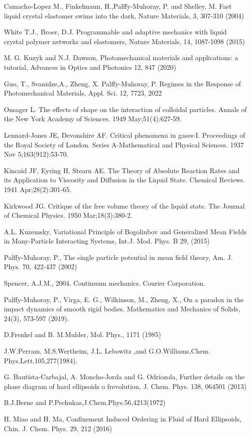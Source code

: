\documentclass{article}
\begin{document}
\begin{thebibliography}{99}
	

 Camacho-Lopez M., Finkelmann, H.,Palffy-Muhoray, P. and
Shelley, M. Fast liquid crystal elastomer swims into the dark, Nature
Materials, 3, 307-310 (2004)

 White T.J., Broer, D.J. Programmable and adaptive mechanics
with liquid crystal polymer networks and elastomers, Nature Materials, 14,
1087-1098 (2015)

 M. G. Kuzyk and N.J. Dawson, Photomechanical materials and
applications: a tutorial, Advances in Optics and Photonics 12, 847 (2020) 

 Guo, T., Svanidze,A., Zheng, X. Palffy-Muhoray, P. Regimes in
the Response of Photomechanical Materials, Appl. Sci. 12, 7723, 2022

 Onsager L. The effects of shape on the interaction of
colloidal particles. Annals of the New York Academy of Sciences. 1949
May;51(4):627-59.

 Lennard-Jones JE, Devonshire AF. Critical phenomena
in gases-I. Proceedings of the Royal Society of London. Series
A-Mathematical and Physical Sciences. 1937 Nov 5;163(912):53-70.

 Kincaid JF, Eyring H, Stearn AE. The Theory of Absolute
Reaction Rates and its Application to Viscosity and Diffusion in the Liquid
State. Chemical Reviews. 1941 Apr;28(2):301-65.

 Kirkwood JG. Critique of the free volume theory of
the liquid state. The Journal of Chemical Physics. 1950 Mar;18(3):380-2.

 A.L. Kuzemsky, Variational Principle of Bogoliubov and
Generalized Mean Fields in Many-Particle Interacting Systems, Int.J. Mod.
Phys. B 29, (2015)

 Palffy-Muhoray, P., The single particle potential in mean
field theory, Am. J. Phys. 70, 422-437 (2002)

 Spencer, A.J.M., 2004. Continuum mechanics. Courier Corporation.

 Palffy-Muhoray, P., Virga, E. G., Wilkinson, M., Zheng,
X., On a paradox in the impact dynamics of smooth rigid bodies. Mathematics
and Mechanics of Solids, 24(3), 573-597 (2019).

 D.\thinspace Frenkel and B. M.\thinspace Mulder, Mol.
Phys., 1171 (1985)

 J.W.Perram, M.S.Wertheim, J.L. Lebowitz ,and
G.O.Williams,Chem. Phys.Lett.105,277(1984).

 G. Bautista-Carbajal, A. Moncho-Jorda and G.
Odriozola, Further details on the phase diagram of hard ellipsoids o
frevolution, J. Chem. Phys. 138, 064501 (2013)

 B.J.Berne and P.Pechukas,J.Chem.Phys.56,4213(1972)

 H. Miao and H. Ma, Confinement Induced Ordering in Fluid of
Hard Ellipsoids, Chin. J. Chem. Phys. 29, 212 (2016)


\end{thebibliography}
\end{document}
